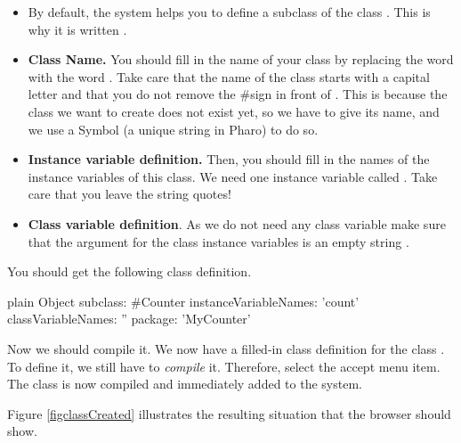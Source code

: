 \documentclass[10pt,twoside,english]{_support/latex/sbabook/sbabook}
\begin{document}
\begin{itemize}
\item By default, the system helps you to define a subclass of the class . This is why it is written .
\end{itemize}

\begin{itemize}
\item \textbf{Class Name.} You should fill in the name of your class by replacing the word  with the word . Take care that the name of the class starts with a capital letter and that you do not remove the \#sign in front of . This is because the class we want to create does not exist yet, so we have to give its name, and we use a Symbol (a unique string in Pharo) to do so. 
\end{itemize}

\begin{itemize}
\item \textbf{Instance variable definition.} Then, you should fill in the names of the instance variables of this class. We need one instance variable called . Take care that you leave the string quotes!
\end{itemize}

\begin{itemize}
\item \textbf{Class variable definition}. As we do not need any class variable make sure that the argument  for the class instance variables is an empty string .
\end{itemize}

You should get the following class definition.

\begin{displaycode}{plain}
Object subclass: #Counter
   instanceVariableNames: 'count'
   classVariableNames: ''
   package: 'MyCounter'
\end{displaycode}

Now we should compile it. We now have a filled-in class definition for the class . To define it, we still have to \textit{compile} it. Therefore, select the accept menu item. The class  is now compiled and immediately added to the system.

Figure \ref{figclassCreated} illustrates the resulting situation that the browser should show.
\end{document}
